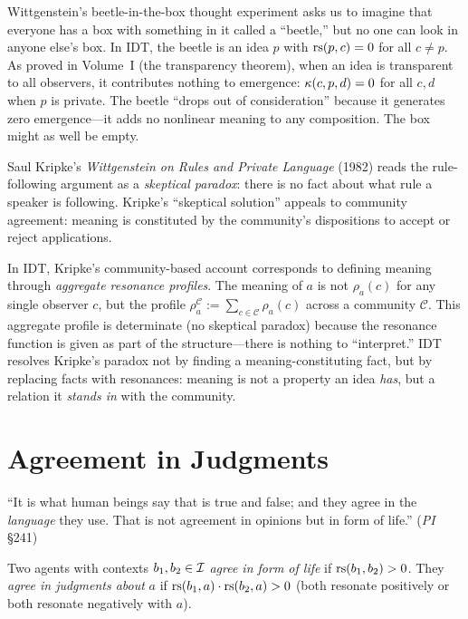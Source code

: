 \begin{remark}
Wittgenstein's beetle-in-the-box thought experiment asks us to imagine
that everyone has a box with something in it called a ``beetle,'' but
no one can look in anyone else's box. In IDT, the beetle is an idea
$p$ with $\mathrm{rs}(p, c) = 0$ for all $c \neq p$. As proved in Volume~I
(the transparency theorem), when an idea is transparent to all observers,
it contributes nothing to emergence:
$\kappa(c, p, d) = 0$ for all $c, d$ when $p$ is private. The beetle
``drops out of consideration'' because it generates zero emergence---it
adds no nonlinear meaning to any composition. The box might as well
be empty.
\end{remark}

\begin{remark}
Saul Kripke's \emph{Wittgenstein on Rules and Private Language} (1982)
reads the rule-following argument as a \emph{skeptical paradox}: there is
no fact about what rule a speaker is following. Kripke's ``skeptical
solution'' appeals to community agreement: meaning is constituted by the
community's dispositions to accept or reject applications.

In IDT, Kripke's community-based account corresponds to defining meaning
through \emph{aggregate resonance profiles}. The meaning of $a$ is not
$\rho_a(c)$ for any single observer $c$, but the profile
$\rho_a^{\mathcal{C}} := \sum_{c \in \mathcal{C}} \rho_a(c)$ across a
community $\mathcal{C}$. This aggregate profile is determinate (no
skeptical paradox) because the resonance function is given as part of the
structure---there is nothing to ``interpret.'' IDT resolves Kripke's
paradox not by finding a meaning-constituting fact, but by replacing facts
with resonances: meaning is not a property an idea \emph{has}, but a
relation it \emph{stands in} with the community.
\end{remark}


\section{Agreement in Judgments}

``It is what human beings say that is true and false; and they agree in the
\emph{language} they use. That is not agreement in opinions but in form of
life.'' (\emph{PI} \S241)

\begin{definition}
\label{def:agreement-form}
Two agents with contexts $b_1, b_2 \in \mathcal{I}$ \emph{agree in form of life}
if $\mathrm{rs}(b_1, b_2) > 0$. They \emph{agree in judgments about} $a$ if
$\mathrm{rs}(b_1, a) \cdot \mathrm{rs}(b_2, a) > 0$ (both resonate positively or both
resonate negatively with $a$).
\end{definition}

